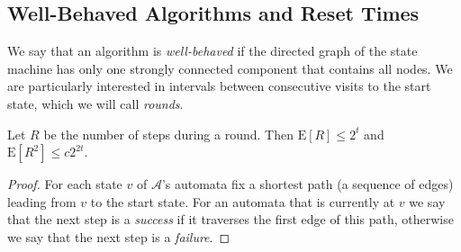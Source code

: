 \documentclass[lotsofwhite]{patmorin}
\newcommand{\E}{\mathrm{E}}
\begin{document}
\subsection{Well-Behaved Algorithms and Reset Times}

We say that an algorithm is \emph{well-behaved} if the directed graph
of the state machine has only one strongly connected component that
contains all nodes.  We are particularly interested in intervals
between consecutive visits to the start state, which we will call
\emph{rounds}.

\begin{lem}
Let $R$ be the number of steps during a round. Then 
$\E[R] \le 2^t$ and $\E[R^2] \le c2^{2t}$.
\end{lem}

\begin{proof}
For each state $v$ of $\mathcal{A}$'s automata fix a shortest path (a
sequence of edges) leading from $v$ to the start state.  For an
automata that is currently at $v$ we say that the next step is a
\emph{success} if it traverses the first edge of this path, otherwise
we say that the next step is a \emph{failure}.


\end{proof}
\end{document}

